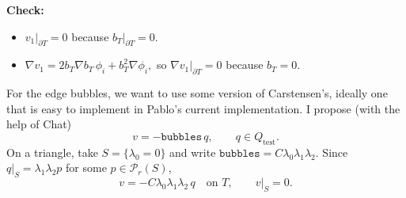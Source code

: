 \documentclass[12pt,a4paper]{article}
\newcommand{\PP}{\mathcal{P}}
\newcommand{\qtest}{Q_{\mathrm{test}}}
\newcommand{\bubbles}{\texttt{bubbles}}
\begin{document}
\textbf{Check:}
\begin{itemize}
    \item $v_1|_{\partial T}=0$ because $b_T|_{\partial T}=0$.
    \item
        $\nabla v_1=2b_T\nabla b_T\,\phi_i+b_T^2\nabla\phi_i,$
    so $\nabla v_1|_{\partial T}=0$ because $b_T=0$.
\end{itemize}

For the edge bubbles, we want to use some version of Carstensen's, ideally one that is easy to implement in Pablo's current implementation. I propose (with the help of Chat)
\begin{equation}
    v=-\bubbles\,q,\qquad q\in\qtest.
\end{equation}
On a triangle, take $S=\{\lambda_0=0\}$ and write
$\bubbles=C\lambda_0\lambda_1\lambda_2$. Since
$q|_S=\lambda_1\lambda_2 p$ for some $p\in\PP_r(S)$,
\begin{equation}
    v=-C\lambda_0\lambda_1\lambda_2\,q\quad\text{on }T,
    \qquad v|_S=0.
\end{equation}
\end{document}
